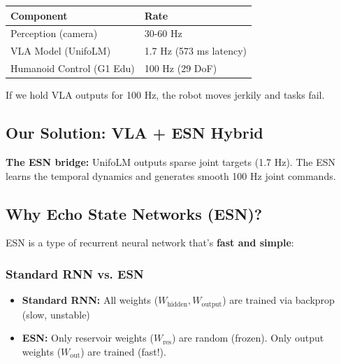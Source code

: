 \documentclass[11pt]{article}
\begin{document}
\begin{center}
\begin{tabular}{|l|l|}
\hline
\textbf{Component} & \textbf{Rate} \\
\hline
Perception (camera) & 30-60 Hz \\
\hline
VLA Model (UnifoLM) & 1.7 Hz (573 ms latency) \\
\hline
Humanoid Control (G1 Edu) & 100 Hz (29 DoF) \\
\hline
\end{tabular}
\end{center}

If we hold VLA outputs for 100 Hz, the robot moves jerkily and tasks fail.

\subsection{Our Solution: VLA + ESN Hybrid}
\begin{center}
\end{center}

\textbf{The ESN bridge:} UnifoLM outputs sparse joint targets (1.7 Hz). The ESN learns the temporal dynamics and generates smooth 100 Hz joint commands.

\subsection{Why Echo State Networks (ESN)?}
ESN is a type of recurrent neural network that's \textbf{fast and simple}:

\subsubsection{Standard RNN vs. ESN}
\begin{itemize}
    \item \textbf{Standard RNN:} All weights ($W_{\text{hidden}}, W_{\text{output}}$) are trained via backprop (slow, unstable)
    \item \textbf{ESN:} Only reservoir weights ($W_{\text{res}}$) are random (frozen). Only output weights ($W_{\text{out}}$) are trained (fast!).
\end{itemize}
\end{document}
